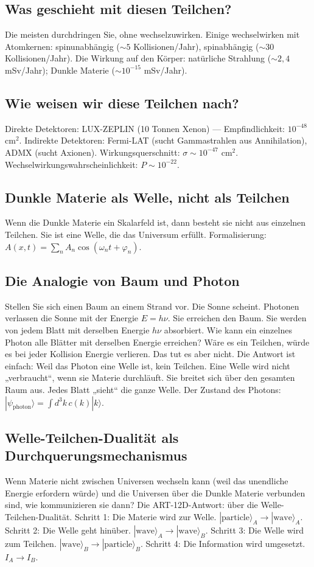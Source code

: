 \subsection{Was geschieht mit diesen Teilchen?}
Die meisten durchdringen Sie, ohne wechselzuwirken. Einige wechselwirken mit Atomkernen: spinunabhängig ($\sim 5$ Kollisionen/Jahr), spinabhängig ($\sim 30$ Kollisionen/Jahr). Die Wirkung auf den Körper: natürliche Strahlung ($\sim 2,4$ mSv/Jahr); Dunkle Materie ($\sim 10^{-15}$ mSv/Jahr).

\subsection{Wie weisen wir diese Teilchen nach?}
Direkte Detektoren: LUX-ZEPLIN (10 Tonnen Xenon) --- Empfindlichkeit: $10^{-48}$ cm$^2$. Indirekte Detektoren: Fermi-LAT (sucht Gammastrahlen aus Annihilation), ADMX (sucht Axionen). Wirkungsquerschnitt: $\sigma \sim 10^{-47}$ cm$^2$. Wechselwirkungswahrscheinlichkeit: $P \sim 10^{-22}$.

\subsection{Dunkle Materie als Welle, nicht als Teilchen}
Wenn die Dunkle Materie ein Skalarfeld ist, dann besteht sie nicht aus einzelnen Teilchen. Sie ist eine Welle, die das Universum erfüllt. Formalisierung: $A(x,t) = \sum_n A_n \cos(\omega_n t + \varphi_n)$.

\subsection{Die Analogie von Baum und Photon}
Stellen Sie sich einen Baum an einem Strand vor. Die Sonne scheint. Photonen verlassen die Sonne mit der Energie $E = h\nu$. Sie erreichen den Baum. Sie werden von jedem Blatt mit derselben Energie $h\nu$ absorbiert. Wie kann ein einzelnes Photon alle Blätter mit derselben Energie erreichen? Wäre es ein Teilchen, würde es bei jeder Kollision Energie verlieren. Das tut es aber nicht. Die Antwort ist einfach: Weil das Photon eine Welle ist, kein Teilchen. Eine Welle wird nicht „verbraucht``, wenn sie Materie durchläuft. Sie breitet sich über den gesamten Raum aus. Jedes Blatt „sieht`` die ganze Welle. Der Zustand des Photons: $|\psi_{\text{photon}}\rangle = \int d^3k \, c(k) |k\rangle$.

\subsection{Welle-Teilchen-Dualität als Durchquerungsmechanismus}
Wenn Materie nicht zwischen Universen wechseln kann (weil das unendliche Energie erfordern würde) und die Universen über die Dunkle Materie verbunden sind, wie kommunizieren sie dann? Die ART-12D-Antwort: über die Welle-Teilchen-Dualität. Schritt 1: Die Materie wird zur Welle. $|\text{particle}\rangle_A \to |\text{wave}\rangle_A$. Schritt 2: Die Welle geht hinüber. $|\text{wave}\rangle_A \to |\text{wave}\rangle_B$. Schritt 3: Die Welle wird zum Teilchen. $|\text{wave}\rangle_B \to |\text{particle}\rangle_B$. Schritt 4: Die Information wird umgesetzt. $I_A \to I_B$.

